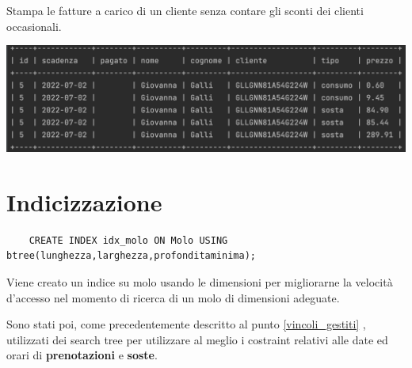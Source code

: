 Stampa le fatture a carico di un cliente senza contare gli sconti dei clienti occasionali.

\begin{center}
    
\includegraphics[width = \linewidth]{img/result_fattura.png}
\end{center}


\section{Indicizzazione}

\begin{lstlisting}
    CREATE INDEX idx_molo ON Molo USING btree(lunghezza,larghezza,profonditaminima);
\end{lstlisting}

Viene creato un indice su molo usando le dimensioni per migliorarne la velocità d'accesso nel momento di ricerca di un molo di dimensioni adeguate.

Sono stati poi, come precedentemente descritto al punto \ref{vincoli_gestiti} , utilizzati dei search tree per utilizzare al meglio i costraint relativi alle date ed orari di \textbf{prenotazioni} e \textbf{soste}.
